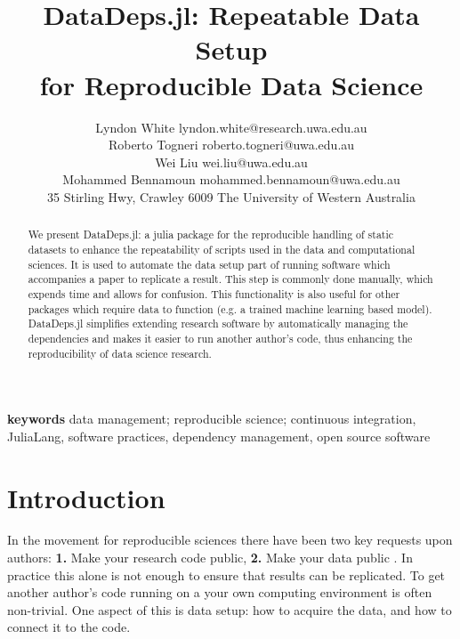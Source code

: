 \documentclass[dvinames]{jors}
\newcommand{\citep}[1]{\parencite{#1}}
\begin{document}
\title{DataDeps.jl: Repeatable Data Setup \\ for Reproducible Data Science}
\author{%
	Lyndon White lyndon.white@research.uwa.edu.au\\
	Roberto Togneri roberto.togneri@uwa.edu.au\\
	Wei Liu wei.liu@uwa.edu.au\\
	Mohammed Bennamoun mohammed.bennamoun@uwa.edu.au\\
	35 Stirling Hwy, Crawley 6009 \hfill The University of Western Australia 
}

\maketitle

\begin{abstract}
	We present DataDeps.jl: a julia package for the reproducible handling of static datasets to enhance the repeatability of scripts used in the data and computational sciences.
	It is used to automate the data setup part of running software which accompanies a paper to replicate a result.
	This step is commonly done manually, which expends time and allows for confusion.
	This functionality is also useful for other packages which require data to function (e.g. a trained machine learning based model).
	DataDeps.jl simplifies extending research software by automatically managing the dependencies and makes it easier to run another author's code, thus enhancing the reproducibility of data science research.
\end{abstract}

\textbf{keywords}
data management;  reproducible science; continuous integration, JuliaLang, software practices, dependency management, open source software


\section{Introduction}

In the movement for reproducible sciences there have been two key requests upon authors:
\textbf{1.} Make your research code public, \textbf{2.} Make your data public \citep{lookafterdata}.
In practice this alone is not enough to ensure that results can be replicated.
To get another author's code running on a your own computing environment is often non-trivial.
One aspect of this is data setup: how to acquire the data, and how to connect it to the code.
\end{document}
